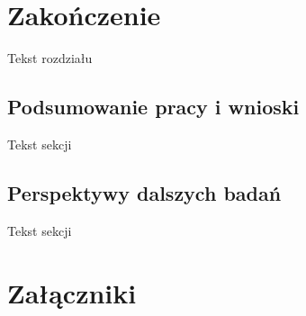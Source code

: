 \documentclass[licencjacka]{pracamgr}
\begin{document}
\chapter{Zakończenie}
Tekst rozdziału
\section{Podsumowanie pracy i wnioski}
Tekst sekcji
\section{Perspektywy dalszych badań}
Tekst sekcji

\begin{thebibliography}{99}













\end{thebibliography}

\chapter*{Załączniki}
\end{document}

